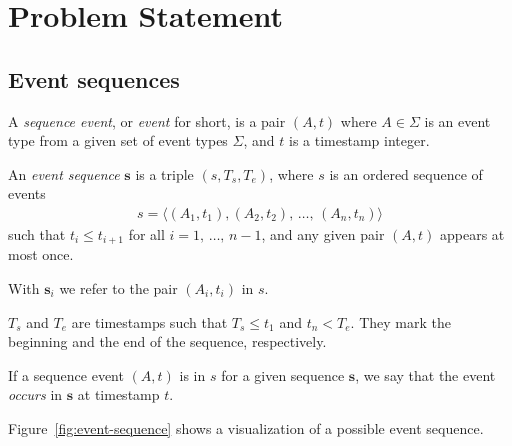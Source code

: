 \chapter{Problem Statement}

\section{Event sequences}

\begin{definition}
A \emph{sequence event}, or \emph{event} for short, is a pair $ (A, t) $ where $ A \in \Sigma $ is an event type from a given set of event types $ \Sigma $, and $ t $ is a timestamp integer.
\end{definition}

\begin{definition}
An \emph{event sequence} $ \boldsymbol{s} $ is a triple $ (s, T_s, T_e) $, where $ s $ is an ordered sequence of events
\begin{align*}
s = \langle (A_1, t_1), (A_2, t_2), \, \ldots, \, (A_n, t_n) \rangle
\end{align*}
such that $ t_i \leq t_{i + 1} $ for all $ i = 1, \, \ldots, \, n - 1 $, and any given pair $ (A, t) $ appears at most once.

With $ \boldsymbol{s}_i $ we refer to the pair $ (A_i, t_i) $ in $ s $.

$ T_s $ and $ T_e $ are timestamps such that $ T_s \leq t_1 $ and $ t_n < T_e $. They mark the beginning and the end of the sequence, respectively.

If a sequence event $ (A, t) $ is in $ s $ for a given sequence $ \boldsymbol{s} $, we say that the event \emph{occurs} in $ \boldsymbol{s} $ at timestamp $ t $.
\end{definition}

Figure~\ref{fig:event-sequence} shows a visualization of a possible event sequence.

\newcommand{\sequencetickmarks}[3]
{
    \pgfmathsetmacro\secondtickmark{#2+0.5}
    \pgfmathsetmacro\lasttickmark{#2+0.5*#1}

    \draw (#2,#3) -- (\lasttickmark,#3);

    \foreach \x in {#2,\secondtickmark,...,\lasttickmark}
        \draw (\x,#3) -- +(0,3pt);
}

\newcommand{\sequenceeventtypes}[4]
{
    \pgfmathsetlengthmacro\nodeheight{(#2)+(.8em)}

    \foreach \t/\eventtype [evaluate=\t as \x using (\t-#3)*0.5+(#1)] in {#4}
    {
        \node [font=\vphantom{$ fbd $}] at (\x,#2) {$ \eventtype $};
        \node (t\t) [inner sep=0] at (\x,\nodeheight) {};
    }
}

